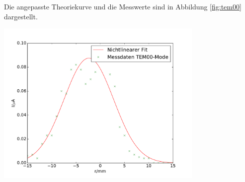 \documentclass[captions=tableheading]{scrartcl}
\begin{document}
Die angepasste Theoriekurve und die Messwerte sind in Abbildung \ref{fig:tem00} dargestellt.
\begin{center}
	\includegraphics[width=10cm]{images/tem00.pdf}
	\label{fig:tem00}
\end{center}
\end{document}
